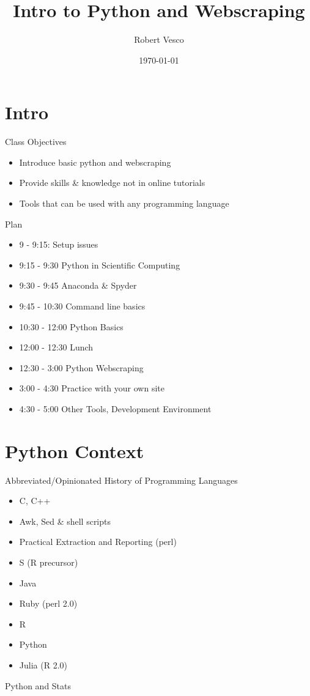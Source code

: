\documentclass[presentation]{beamer}
\author{Robert Vesco}
\date{\today}
\title{Intro to Python and Webscraping}
\begin{document}
\maketitle

\section{Intro}
\label{sec-1}

\begin{frame}[label=sec-1-1]{Class Objectives}
\begin{itemize}
\item Introduce basic python and webscraping
\item Provide skills \& knowledge not in online tutorials
\item Tools that can be used with any programming language
\end{itemize}
\end{frame}
\begin{frame}[label=sec-1-2]{Plan}
\begin{itemize}
\item 9 - 9:15: Setup issues
\item 9:15 - 9:30 Python in Scientific Computing
\item 9:30 - 9:45 Anaconda \& Spyder
\item 9:45 - 10:30 Command line basics
\item 10:30 - 12:00 Python Basics
\item 12:00 - 12:30 Lunch
\item 12:30 - 3:00 Python Webscraping
\item 3:00 - 4:30 Practice with your own site
\item 4:30 - 5:00 Other Tools, Development Environment
\end{itemize}
\end{frame}
\section{Python Context}
\label{sec-2}

\begin{frame}[label=sec-2-1]{Abbreviated/Opinionated History of Programming Languages}
\begin{itemize}
\item C, C++
\item Awk, Sed \& shell scripts
\item Practical Extraction and Reporting (perl)
\item S (R precursor)
\item Java
\item Ruby (perl 2.0)
\item R
\item Python
\item Julia (R 2.0)
\end{itemize}
\end{frame}
\begin{frame}[label=sec-2-2]{Python and Stats}
\end{frame}
\end{document}
